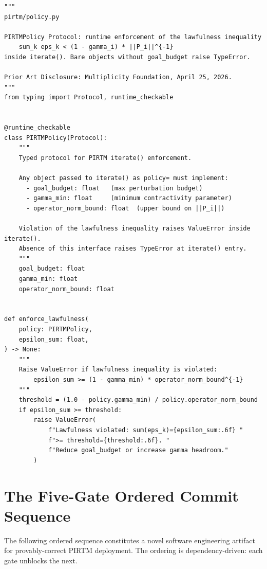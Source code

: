\documentclass[12pt,letterpaper]{article}
\theoremstyle{definition}
\theoremstyle{remark}
\begin{document}
\begin{lstlisting}[caption={\texttt{pirtm/policy.py} --- PIRTMPolicy Protocol stub},
                   label={lst:policy}]
"""
pirtm/policy.py

PIRTMPolicy Protocol: runtime enforcement of the lawfulness inequality
    sum_k eps_k < (1 - gamma_i) * ||P_i||^{-1}
inside iterate(). Bare objects without goal_budget raise TypeError.

Prior Art Disclosure: Multiplicity Foundation, April 25, 2026.
"""
from typing import Protocol, runtime_checkable


@runtime_checkable
class PIRTMPolicy(Protocol):
    """
    Typed protocol for PIRTM iterate() enforcement.

    Any object passed to iterate() as policy= must implement:
      - goal_budget: float   (max perturbation budget)
      - gamma_min: float     (minimum contractivity parameter)
      - operator_norm_bound: float  (upper bound on ||P_i||)

    Violation of the lawfulness inequality raises ValueError inside iterate().
    Absence of this interface raises TypeError at iterate() entry.
    """
    goal_budget: float
    gamma_min: float
    operator_norm_bound: float


def enforce_lawfulness(
    policy: PIRTMPolicy,
    epsilon_sum: float,
) -> None:
    """
    Raise ValueError if lawfulness inequality is violated:
        epsilon_sum >= (1 - gamma_min) * operator_norm_bound^{-1}
    """
    threshold = (1.0 - policy.gamma_min) / policy.operator_norm_bound
    if epsilon_sum >= threshold:
        raise ValueError(
            f"Lawfulness violated: sum(eps_k)={epsilon_sum:.6f} "
            f">= threshold={threshold:.6f}. "
            f"Reduce goal_budget or increase gamma headroom."
        )
\end{lstlisting}

\section{The Five-Gate Ordered Commit Sequence}
\label{sec:gates}

The following ordered sequence constitutes a novel software engineering
artifact for provably-correct PIRTM deployment. The ordering is
dependency-driven: each gate unblocks the next.
\end{document}
